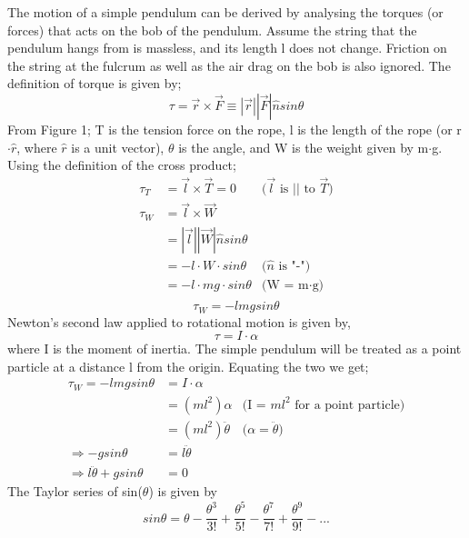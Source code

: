 \documentclass[iop]{emulateapj}
\begin{document}
\begin{figure*}
The motion of a simple pendulum can be derived by analysing the torques (or forces) that acts 
on the bob of the pendulum. Assume the string that the pendulum hangs from is massless, and
its length l does not change. Friction on the string at the fulcrum as well as the
air drag on the bob is also ignored. The definition of torque is given by;
\begin{equation}
\boxed{\tau = \vec{r} \times \vec{F} \equiv |\vec{r}||\vec{F}|\hat{n}sin\theta}
\end{equation}
From Figure 1; T is the tension force on the rope, l is the length of the
rope (or r$\cdot\hat{r}$, where $\hat{r}$ is a unit vector), $\theta$ is the angle, and W is the weight given by m$\cdot$g.
Using the definition of the cross product;
\begin{align*}
\tau_T & = \vec{l} \times \vec{T} = 0 & \text{($\vec{l}$ is $||$ to $\vec{T}$)}\\
\tau_W & = \vec{l} \times \vec{W}\\
& = |\vec{l}||\vec{W}|\hat{n}sin\theta\\
& = -l\cdot W\cdot sin\theta & \text{($\hat{n}$ is "-")}\\
& = -l\cdot mg\cdot sin\theta & \text{(W = m$\cdot$g)}\\
\end{align*}
\begin{equation}
\boxed{\tau_W = -lmgsin\theta}
\end{equation}
Newton's second law applied to rotational motion is given by,
\begin{equation}
\tau = I\cdot\alpha
\end{equation}
where I is the moment of inertia. The simple pendulum will be 
treated as a point particle at a distance l from the origin.
Equating the two we get;
\begin{align*}
\tau_W = -lmgsin\theta & = I\cdot\alpha\\
& = (ml^2)\alpha & \text{(I = $ml^2$ for a point particle)}\\
& = (ml^2)\ddot{\theta} & \text{($\alpha = \ddot{\theta}$)}\\
\Rightarrow -gsin\theta & = l\ddot{\theta}\\
\Rightarrow l\ddot{\theta} + gsin\theta & = 0
\end{align*}
The Taylor series of sin($\theta$) is given by
\begin{equation}
\boxed{sin\theta = \theta - \frac{\theta^3}{3!} + \frac{\theta^5}{5!} - \frac{\theta^7}{7!} + \frac{\theta^9}{9!} - ...}
\end{equation}

\end{figure*}
\end{document}
